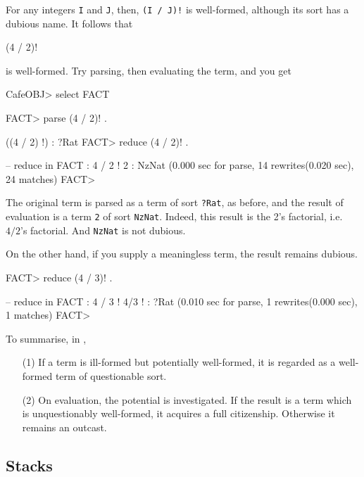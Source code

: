 \documentclass[a4paper]{memoir}
\begin{document}
For any integers \verb|I| and \verb|J|, then, \verb|(I / J)!| is well-formed,
although its sort has a dubious name. It follows that
\begin{vvtm}
\begin{ccode}
   (4 / 2)!
\end{ccode}
\end{vvtm}
is well-formed. Try parsing, then evaluating the term, and you get
\begin{vvtm}
\begin{ccode}
  CafeOBJ> select FACT     

  FACT> parse (4 / 2)! .

  ((4 / 2) !) : ?Rat
  FACT> reduce (4 / 2)! .

  -- reduce in FACT : 4 / 2 !
  2 : NzNat
  (0.000 sec for parse, 14 rewrites(0.020 sec), 24 matches)
  FACT>
\end{ccode}
\end{vvtm}
The original term is parsed as a term of sort \verb|?Rat|, as before, and
the result of evaluation is a term \verb|2| of sort \verb|NzNat|.
Indeed, this result is the 2's factorial, i.e. $4/2$'s factorial.
And \verb|NzNat| is not dubious.

On the other hand, if you supply a meaningless term, the result remains
dubious.
\begin{vvtm}
\begin{ccode}
  FACT> reduce (4 / 3)! .

  -- reduce in FACT : 4 / 3 !
  4/3 ! : ?Rat
  (0.010 sec for parse, 1 rewrites(0.000 sec), 1 matches)
  FACT>
\end{ccode}
\end{vvtm}
To summarise, in \cafeobj,
\begin{itemize}
\item[(1)] If a term is ill-formed but potentially well-formed,
  it is regarded as a well-formed term of questionable sort.
\item[(2)] On evaluation, the potential is investigated.
  If the result is a term which is unquestionably well-formed,
  it acquires a full citizenship. Otherwise it remains an outcast.
\end{itemize}

\subsection{Stacks}
\end{document}

